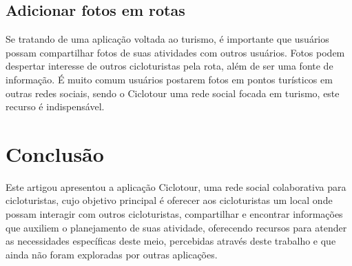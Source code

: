 \subsection{Adicionar fotos em rotas}
Se tratando de uma aplicação voltada ao turismo, é importante que usuários possam compartilhar fotos de suas atividades com outros usuários. Fotos 
podem despertar interesse de outros cicloturistas pela rota, além de ser uma fonte de informação. É muito comum usuários postarem fotos em pontos 
turísticos em outras redes sociais, sendo o Ciclotour uma rede social focada em turismo, este recurso é indispensável.

\section{Conclusão}
Este artigou apresentou a aplicação Ciclotour, uma rede social colaborativa para cicloturistas, cujo objetivo principal é oferecer aos cicloturistas 
um local onde possam interagir com outros cicloturistas, compartilhar e encontrar informações que auxiliem o planejamento de suas atividade, 
oferecendo recursos para atender as necessidades específicas deste meio, percebidas através deste trabalho e que ainda não foram exploradas por 
outras aplicações.



